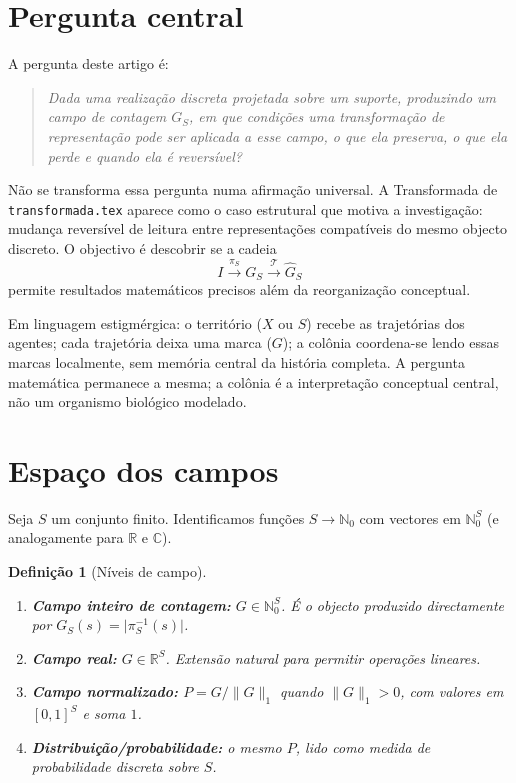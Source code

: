 \documentclass[11pt,a4paper]{article}
\newtheorem{definicao}{Definição}
\begin{document}
\section{Pergunta central}

A pergunta deste artigo é:

\begin{quote}
\textit{Dada uma realização discreta projetada sobre um suporte, produzindo um campo de contagem \(G_S\), em que condições uma transformação de representação pode ser aplicada a esse campo, o que ela preserva, o que ela perde e quando ela é reversível?}
\end{quote}

Não se transforma essa pergunta numa afirmação universal. A Transformada de \texttt{transformada.tex} aparece como o caso estrutural que motiva a investigação: mudança reversível de leitura entre representações compatíveis do mesmo objecto discreto. O objectivo é descobrir se a cadeia
\[
I\xrightarrow{\pi_S}G_S\xrightarrow{\mathcal T}\widehat G_S
\]
permite resultados matemáticos precisos além da reorganização conceptual.

Em linguagem estigmérgica: o território (\(X\) ou \(S\)) recebe as trajetórias dos agentes; cada trajetória deixa uma marca (\(G\)); a colônia coordena-se lendo essas marcas localmente, sem memória central da história completa. A pergunta matemática permanece a mesma; a colônia é a interpretação conceptual central, não um organismo biológico modelado.

\section{Espaço dos campos}

Seja \(S\) um conjunto finito. Identificamos funções \(S\to\mathbb N_0\) com vectores em \(\mathbb N_0^S\) (e analogamente para \(\mathbb R\) e \(\mathbb C\)).

\begin{definicao}[Níveis de campo]
\begin{enumerate}[leftmargin=1.5em]
\item \textbf{Campo inteiro de contagem:} \(G\in\mathbb N_0^S\). É o objecto produzido directamente por \(G_S(s)=\lvert\pi_S^{-1}(s)\rvert\).
\item \textbf{Campo real:} \(G\in\mathbb R^S\). Extensão natural para permitir operações lineares.
\item \textbf{Campo normalizado:} \(P=G/\lVert G\rVert_1\) quando \(\lVert G\rVert_1>0\), com valores em \([0,1]^S\) e soma \(1\).
\item \textbf{Distribuição/probabilidade:} o mesmo \(P\), lido como medida de probabilidade discreta sobre \(S\).
\end{enumerate}
\end{definicao}
\end{document}
